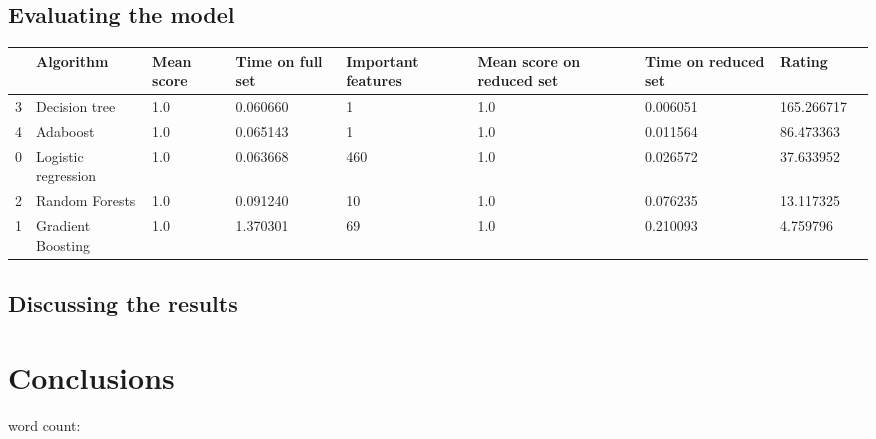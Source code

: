 \documentclass[british]{article}
\begin{document}
\subsection{Evaluating the model}
\label{evaluation}
\begin{tabular}{lllllllll}
	\toprule
	{} &            Algorithm &  Mean score &  Time on full set & Important features &  Mean score on reduced set &  Time on reduced set &      Rating \\
	\midrule
	3 &        Decision tree &         1.0 &                                  0.060660 &                            1 &                                1.0 &                                     0.006051 &  165.266717 \\
	4 &             Adaboost &         1.0 &                                  0.065143 &                            1 &                                1.0 &                                     0.011564 &   86.473363 \\
	0 &  Logistic regression &         1.0 &                                  0.063668 &                          460 &                                1.0 &                                     0.026572 &   37.633952 \\
	2 &       Random Forests &         1.0 &                                  0.091240 &                           10 &                                1.0 &                                     0.076235 &   13.117325 \\
	1 &    Gradient Boosting &         1.0 &                                  1.370301 &                           69 &                                1.0 &                                     0.210093 &    4.759796 \\
	\bottomrule
\end{tabular}

\subsection{Discussing the results}
\label{discussion}


\section{Conclusions}
 
 
word count: 
\printbibliography
\end{document}
